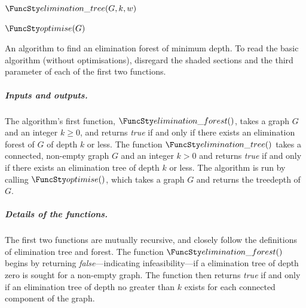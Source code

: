 {{\begin{algorithm}[h!]
    \vspace{.5em}

    \nl $\TDConnected(G,k,w)$ \label{td_connected_fun} \;
    \nl {}
    \nl {}
    \nl {}

    \vspace{.5em}

    \nl $\TDOptimise(G)$ \label{td_optimise_fun} \;
    \nl {}
    \nl {}
    \nl {}
    \caption{An algorithm to find an elimination forest of minimum depth.  To read the basic algorithm
    (without optimisations), disregard the shaded sections and the third parameter
    of each of the first two functions.}
    \label{TheAlgorithm}
    \end{algorithm}
    }

    \subparagraph*{Inputs and outputs.}
    The algorithm's first function, $\TDGeneral()$, takes a graph $G$ and an integer $k \geq 0$, and returns
    \emph{true} if and only if there exists an elimination forest of $G$ of depth $k$ or less.  The function
    $\TDConnected()$ takes a connected, non-empty graph $G$ and an integer $k > 0$ and returns \emph{true}
    if and only if there exists an elimination tree of depth $k$ or less.
    The algorithm is run by calling $\TDOptimise()$, which takes a graph $G$ and returns the treedepth of $G$.

    \subparagraph*{Details of the functions.}
    The first two functions are mutually recursive, and closely follow
    the definitions of elimination tree and forest.
    The function $\TDGeneral()$ begins by returning \emph{false}---indicating
    infeasibility---if a elimination tree of depth zero is sought for a non-empty graph.
    The function then returns \emph{true} if and only if an elimination tree of depth no greater
    than $k$ exists for each connected component of the graph.

}
